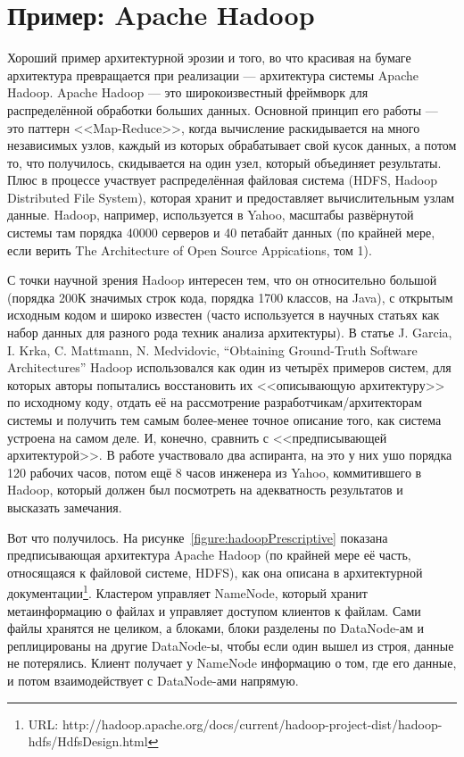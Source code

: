 \documentclass{../../text-style}
\begin{document}
\section{Пример: Apache Hadoop}


Хороший пример архитектурной эрозии и того, во что красивая на бумаге архитектура превращается при реализации --- архитектура системы Apache Hadoop. Apache Hadoop --- это широкоизвестный фреймворк для распределённой обработки больших данных. Основной принцип его работы --- это паттерн <<Map-Reduce>>, когда вычисление раскидывается на много независимых узлов, каждый из которых обрабатывает свой кусок данных, а потом то, что получилось, скидывается на один узел, который объединяет результаты. Плюс в процессе участвует распределённая файловая система (HDFS, Hadoop Distributed File System), которая хранит и предоставляет вычислительным узлам данные. Hadoop, например, используется в Yahoo, масштабы развёрнутой системы там порядка 40000 серверов и 40 петабайт данных (по крайней мере, если верить The Architecture of Open Source Appications, том 1).

С точки научной зрения Hadoop интересен тем, что он относительно большой (порядка 200К значимых строк кода, порядка 1700 классов, на Java), с открытым исходным кодом и широко известен (часто используется в научных статьях как набор данных для разного рода техник анализа архитектуры). В статье J. Garcia, I. Krka, C. Mattmann, N. Medvidovic, ``Obtaining Ground-Truth Software Architectures'' Hadoop использовался как один из четырёх примеров систем, для которых авторы попытались восстановить их <<описывающую архитектуру>> по исходному коду, отдать её на рассмотрение разработчикам/архитекторам системы и получить тем самым более-менее точное описание того, как система устроена на самом деле. И, конечно, сравнить с <<предписывающей архитектурой>>. В работе участвовало два аспиранта, на это у них ушо порядка 120 рабочих часов, потом ещё 8 часов инженера из Yahoo, коммитившего в Hadoop, который должен был посмотреть на адекватность результатов и высказать замечания.

Вот что получилось. На рисунке~\ref{figure:hadoopPrescriptive} показана предписывающая архитектура Apache Hadoop (по крайней мере её часть, относящаяся к файловой системе, HDFS), как она описана в архитектурной документации\footnote{URL: http://hadoop.apache.org/docs/current/hadoop-project-dist/hadoop-hdfs/HdfsDesign.html}. Кластером управляет NameNode, который хранит метаинформацию о файлах и управляет доступом клиентов к файлам. Сами файлы хранятся не целиком, а блоками, блоки разделены по DataNode-ам и реплицированы на другие DataNode-ы, чтобы если один вышел из строя, данные не потерялись. Клиент получает у NameNode информацию о том, где его данные, и потом взаимодействует с DataNode-ами напрямую.
\end{document}
